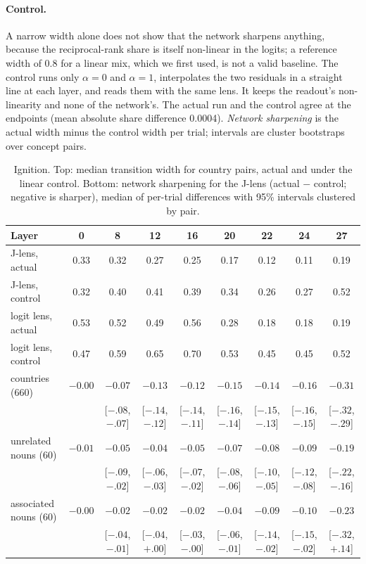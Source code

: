 \documentclass[11pt]{article}
\theoremstyle{definition}
\begin{document}
\paragraph{Control.} A narrow width alone does not show that the network sharpens anything, because
the reciprocal-rank share is itself non-linear in the logits; a reference width of 0.8 for a linear mix,
which we first used, is not a valid baseline. The control runs only $\alpha=0$ and $\alpha=1$,
interpolates the two residuals in a straight line at each layer, and reads them with the same lens. It
keeps the readout's non-linearity and none of the network's. The actual run and the control agree at
the endpoints (mean absolute share difference 0.0004). \emph{Network sharpening} is the actual width
minus the control width per trial; intervals are cluster bootstraps over concept pairs.

\begin{table}[t]
\centering
\caption{Ignition. Top: median transition width for country pairs, actual and under the linear
control. Bottom: network sharpening for the J-lens (actual $-$ control; negative is sharper), median of
per-trial differences with 95\% intervals clustered by pair.}
\label{tab:ignition}
\small
\setlength{\tabcolsep}{2.6pt}
\begin{tabular}{lcccccccc}
\toprule
Layer & 0 & 8 & 12 & 16 & 20 & 22 & 24 & 27 \\
\midrule
J-lens, actual & 0.33 & 0.32 & 0.27 & 0.25 & 0.17 & 0.12 & 0.11 & 0.19 \\
J-lens, control & 0.32 & 0.40 & 0.41 & 0.39 & 0.34 & 0.26 & 0.27 & 0.52 \\
logit lens, actual & 0.53 & 0.52 & 0.49 & 0.56 & 0.28 & 0.18 & 0.18 & 0.19 \\
logit lens, control & 0.47 & 0.59 & 0.65 & 0.70 & 0.53 & 0.45 & 0.45 & 0.52 \\
\midrule
countries (660) & $-0.00$ & $-0.07$ & $-0.13$ & $-0.12$ & $-0.15$ & $-0.14$ & $-0.16$ & $-0.31$ \\
 & & {\scriptsize[$-.08$,$-.07$]} & {\scriptsize[$-.14$,$-.12$]} & {\scriptsize[$-.14$,$-.11$]} & {\scriptsize[$-.16$,$-.14$]} & {\scriptsize[$-.15$,$-.13$]} & {\scriptsize[$-.16$,$-.15$]} & {\scriptsize[$-.32$,$-.29$]} \\
unrelated nouns (60) & $-0.01$ & $-0.05$ & $-0.04$ & $-0.05$ & $-0.07$ & $-0.08$ & $-0.09$ & $-0.19$ \\
 & & {\scriptsize[$-.09$,$-.02$]} & {\scriptsize[$-.06$,$-.03$]} & {\scriptsize[$-.07$,$-.02$]} & {\scriptsize[$-.08$,$-.06$]} & {\scriptsize[$-.10$,$-.05$]} & {\scriptsize[$-.12$,$-.08$]} & {\scriptsize[$-.22$,$-.16$]} \\
associated nouns (60) & $-0.00$ & $-0.02$ & $-0.02$ & $-0.02$ & $-0.04$ & $-0.09$ & $-0.10$ & $-0.23$ \\
 & & {\scriptsize[$-.04$,$-.01$]} & {\scriptsize[$-.04$,$+.00$]} & {\scriptsize[$-.03$,$-.00$]} & {\scriptsize[$-.06$,$-.01$]} & {\scriptsize[$-.14$,$-.02$]} & {\scriptsize[$-.15$,$-.02$]} & {\scriptsize[$-.32$,$+.14$]} \\
\bottomrule
\end{tabular}
\end{table}
\end{document}

